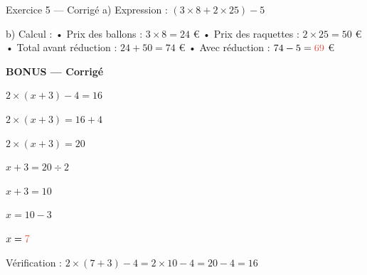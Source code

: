 \documentclass[11pt,a4paper]{article}
\DeclareRobustCommand{\rep}[1]{\begingroup\color{warning}\ifmmode #1\else \textbf{#1}\fi\endgroup}
\begin{document}
	\begin{exercisebox}{ Exercice 5 — Corrigé}
		a) Expression : $(3 \times 8 + 2 \times 25) - 5$
		
		b) Calcul :
		• Prix des ballons : $3 \times 8 = 24$\,\,\euro
		• Prix des raquettes : $2 \times 25 = 50$\,\,\euro
		• Total avant réduction : $24 + 50 = 74$\,\,\euro
		• Avec réduction : $74 - 5 = \rep{69}$\,\,\euro
	\end{exercisebox}
	
	\begin{tcolorbox}[colback=accent!10,colframe=accent]
		\textbf{BONUS — Corrigé}
		
		$2 \times (x + 3) - 4 = 16$
		
		$2 \times (x + 3) = 16 + 4$
		
		$2 \times (x + 3) = 20$
		
		$x + 3 = 20 \div 2$
		
		$x + 3 = 10$
		
		$x = 10 - 3$
		
		$x = \rep{7}$
		
		Vérification : $2 \times (7 + 3) - 4 = 2 \times 10 - 4 = 20 - 4 = 16$
	\end{tcolorbox}
	
\end{document}
